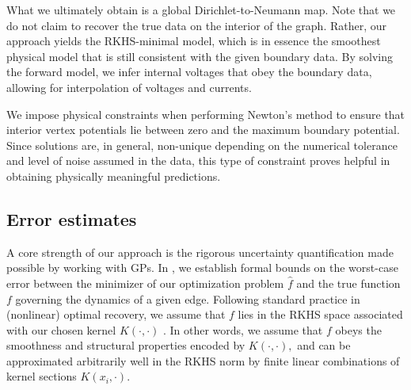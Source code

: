 \documentclass{article}
\theoremstyle{definition}
\theoremstyle{remark}
\begin{document}
What we ultimately obtain is a global Dirichlet-to-Neumann map. Note that we do not claim to recover the true data on the interior of the graph. Rather, our approach yields the RKHS-minimal model, which is in essence the smoothest physical model that is still consistent with the given boundary data. By solving the forward model, we infer internal voltages that obey the boundary data, allowing for interpolation of voltages and currents.

We impose physical constraints when performing Newton's method to ensure that interior vertex potentials lie between zero and the maximum boundary potential. Since solutions are, in general, non-unique depending on the numerical tolerance and level of noise assumed in the data, this type of constraint proves helpful in obtaining physically meaningful predictions.

\subsection{Error estimates}\label{sec:error}

A core strength of our approach is the rigorous uncertainty quantification made possible by working with GPs. In , we establish formal bounds on the worst-case error between the minimizer of our optimization problem $\hat{f}$ and the true function $f$ governing the dynamics of a given edge. Following standard practice in (nonlinear) optimal recovery, we assume that $f$ lies in the RKHS space associated with our chosen kernel $K(\cdot,\cdot)$ \cite{azarnavid_reproducing_2019,fiedler_practical_2023,kakade_worst-case_2005,leung2020introduction,reed_error_2024,zhou_gaussian_2023}. In other words, we assume that $f$ obeys the smoothness and structural properties encoded by $K(\cdot,\cdot),$ and can be approximated arbitrarily well in the RKHS norm by finite linear combinations of kernel sections $K(x_i,\cdot).$ 
\end{document}
